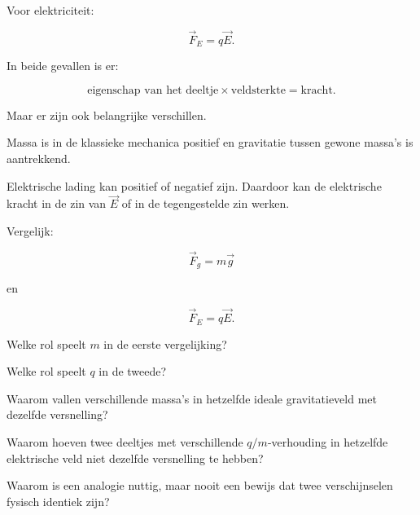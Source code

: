 \documentclass{ximera}
\begin{document}
Voor elektriciteit:

\[
\vec F_E=q\vec E.
\]

In beide gevallen is er:

\[
\boxed{
\text{eigenschap van het deeltje}
\times
\text{veldsterkte}
=
\text{kracht}.
}
\]

Maar er zijn ook belangrijke verschillen.

Massa is in de klassieke mechanica positief en gravitatie tussen
gewone massa's is aantrekkend.

Elektrische lading kan positief of negatief zijn. Daardoor kan de
elektrische kracht in de zin van $\vec E$ of in de tegengestelde zin
werken.


\begin{oefening}{\oefU\ESS}

Vergelijk:

\[
\vec F_g=m\vec g
\]

en

\[
\vec F_E=q\vec E.
\]

\begin{question}
Welke rol speelt $m$ in de eerste vergelijking?
\end{question}

\begin{question}
Welke rol speelt $q$ in de tweede?
\end{question}

\begin{question}
Waarom vallen verschillende massa's in hetzelfde ideale gravitatieveld
met dezelfde versnelling?
\end{question}

\begin{question}
Waarom hoeven twee deeltjes met verschillende $q/m$-verhouding in
hetzelfde elektrische veld niet dezelfde versnelling te hebben?
\end{question}

\begin{question}
Waarom is een analogie nuttig, maar nooit een bewijs dat twee
verschijnselen fysisch identiek zijn?
\end{question}

\end{oefening}



\end{document}
